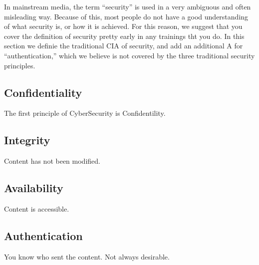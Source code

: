 In mainstream media, the term ``security'' is used in a very ambiguous and often misleading way. Because of this, most people do not have a good understanding of what security is, or how it is achieved. For this reason, we suggest that you cover the definition of security pretty early in any trainings tht you do. In this section we definie the traditional CIA of security, and add an additional A for ``authentication,'' which we believe is not covered by the three traditional security principles.  

\subsection{Confidentiality}
The first principle of CyberSecurity is Confidentility.
\subsection{Integrity}
Content has not been modified.
\subsection{Availability}
Content is accessible.
\subsection{Authentication}
You know who sent the content. Not always desirable.
